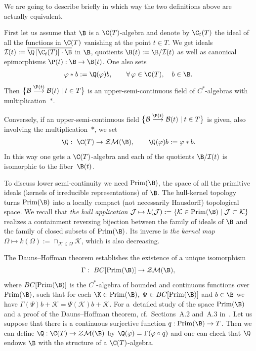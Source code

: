 We are going to describe brief\/ly in which way the two def\/initions above are actually equivalent.

First let us assume that $\B$ is a $\C(T)$-algebra and denote by $\C_t(T)$ the ideal of all the functions in
$\C(T)$ vanishing at the point $t\in T$. We get ideals
$\mathcal I(t):=\overline{\Q\left[\C_t(T)\right]\cdot\B}$ in $\B$, quotients $\B(t):=\B/\mathcal I(t)$ as well as canonical
epimorphisms $\P(t):\B\rightarrow \B(t)$. One also sets
\begin{gather*}%
\varphi\ast b:=\Q(\varphi)b ,\qquad \forall\,\varphi\in\C(T),\quad b\in\B .
\end{gather*}
Then $\big\{\mathcal B\overset{\P(t)}{\longrightarrow}\mathcal B(t)\mid t\in T\big\}$ is an upper-semi-continuous
f\/ield of $C^*$-algebras with multiplication~$\ast$.

Conversely, if an upper-semi-continuous f\/ield
$\big\{\mathcal B\overset{\P(t)}{\longrightarrow}\mathcal B(t)\mid t\in T\big\}$ is given,
also involving the multiplication~$\ast$, we set
\begin{gather*}%
\Q: \ \C(T)\rightarrow\mathcal Z\mathcal M(\B),\qquad \Q(\varphi)b:=\varphi\ast b.
\end{gather*}
In this way one gets a $\C(T)$-algebra and each of the quotients $\B/\mathcal I(t)$ is isomorphic to the f\/i\-ber~$\B(t)$.

To discuss lower semi-continuity we need ${\rm Prim}(\B)$, the space of all the primitive ideals
(kernels of irreducible representations) of $\B$. The hull-kernel topology
turns ${\rm Prim}(\B)$ into a locally compact (not necessarily Hausdorf\/f) topological space. We recall that {\it the hull application}
$\mathcal J\mapsto h(\mathcal J):=\{\mathcal K\in {\rm Prim}(\B)\mid \mathcal J\subset\mathcal K\}$
realizes a containment reversing bijection between the family of ideals of $\B$ and the family
of closed subsets of ${\rm Prim}(\B)$. Its inverse is {\it the kernel map}
$\Omega\mapsto k(\Omega):=\cap_{\mathcal K\in\Omega}\mathcal K$, which is also decreasing.

The Dauns--Hof\/fman theorem establishes the existence of a unique isomorphism
\[
\Gamma: \ BC[{\rm Prim}(\B)]\to \mathcal Z\mathcal M(\B) ,
\] where $BC[{\rm Prim}(\B)]$ is the $C^*$-algebra of bounded and continuous
functions over ${\rm Prim}(\B)$, such that for each $\K\in {\rm Prim}(\B)$,
$\Psi\in BC[{\rm Prim}(\B)]$ and $b\in\B$ we have $\Gamma(\Psi)b+\mathcal K=\Psi(\mathcal K)b+\mathcal K$.
For a~detailed study of the space ${\rm Prim}(\B)$ and a
proof of the Dauns--Hof\/fman theorem, cf.\ Sections~A.2 and~A.3 in~\cite{RW}.
Let us suppose that there is a continuous surjective function $q:{\rm Prim}(\B)\to T$. Then we can def\/ine
$\Q:\C(T)\to \mathcal Z\mathcal M(\B)$ by $\Q(\varphi)=\Gamma(\varphi\circ q)$ and one can check that
$\Q$ endows $\B$ with the structure of a $\C(T)$-algebra.


